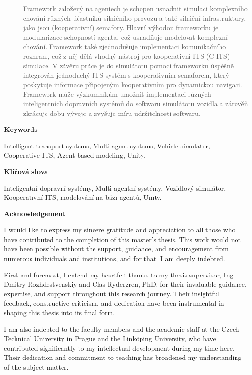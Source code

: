 \documentclass[titlepage, 12pt]{article}
\begin{document}
\begin{abstract}
    Framework založený na agentech je schopen usnadnit simulaci komplexního chování
    různých účastníků silničního provozu a také silniční infrastruktury, jako jsou (kooperativní)
    semafory. Hlavní výhodou frameworku je modularizace schopností agenta, což usnadňuje
    modelovat komplexní chování. Framework také zjednodušuje implementaci komunikačního rozhraní, což z něj dělá vhodný nástroj pro kooperativní ITS (C-ITS) simulace.
    V závěru práce je do simulátoru pomocí frameworku úspěšně integrován jednoduchý ITS systém s kooperativním semaforem, který poskytuje informace připojeným
    kooperativním pro dynamickou navigaci. Framework
    může výzkumníkům umožnit implementaci různých inteligentních dopravních systémů do
    softwaru simulátoru vozidla a zárověň zkrácuje dobu vývoje a zvyšuje míru udržitelnosti softwaru.
    \end{abstract}

    \vspace*{.5cm}
    {\large\bfseries Keywords}\medskip

    Intelligent transport systems, Multi-agent systems, Vehicle simulator, Cooperative ITS, Agent-based modeling, Unity. \vspace{1cm}

    {\large\bfseries Klíčová slova}\medskip

    Inteligentní dopravní systémy, Multi-agentní systémy, Vozidlový simulátor, Kooperativní ITS, modelování na bázi agentů, Unity. \clearpage

    

    \vspace*{6cm}
    {\large\bfseries Acknowledgement}\medskip

I would like to express my sincere gratitude and appreciation to all those who have contributed
to the completion of this master's thesis. This work would not have been possible without the
support, guidance, and encouragement from numerous individuals and institutions, and for that,
I am deeply indebted.

First and foremost, I extend my heartfelt thanks to my thesis supervisor, Ing. Dmitry
Rozhdestvenskiy and Clas Rydergren, PhD, for their invaluable guidance, expertise, and support
throughout this research journey. Their insightful feedback, constructive criticism, and
dedication have been instrumental in shaping this thesis into its final form. 

I am also indebted to the faculty members and the academic staff at the Czech Technical
University in Prague and the Linköping University, who have contributed significantly to my
intellectual development during my time here. Their dedication and commitment to teaching 
has broadened my understanding of the subject matter.
\end{document}
